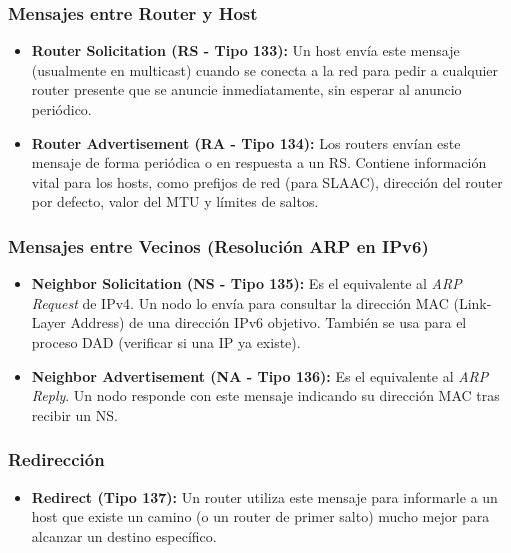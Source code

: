 \subsubsection{Mensajes entre Router y Host}
\begin{itemize}[label=\textcolor{acento!60}{$\bullet$}]
    \item \textbf{Router Solicitation (RS - Tipo 133):} Un host envía este mensaje (usualmente en multicast) cuando se conecta a la red para pedir a cualquier router presente que se anuncie inmediatamente, sin esperar al anuncio periódico.
    \item \textbf{Router Advertisement (RA - Tipo 134):} Los routers envían este mensaje de forma periódica o en respuesta a un RS. Contiene información vital para los hosts, como prefijos de red (para SLAAC), dirección del router por defecto, valor del MTU y límites de saltos.
\end{itemize}

\subsubsection{Mensajes entre Vecinos (Resolución ARP en IPv6)}
\begin{itemize}[label=\textcolor{acento!120}{$\bullet$}]
    \item \textbf{Neighbor Solicitation (NS - Tipo 135):} Es el equivalente al \textit{ARP Request} de IPv4. Un nodo lo envía para consultar la dirección MAC (Link-Layer Address) de una dirección IPv6 objetivo. También se usa para el proceso DAD (verificar si una IP ya existe).
    \item \textbf{Neighbor Advertisement (NA - Tipo 136):} Es el equivalente al \textit{ARP Reply}. Un nodo responde con este mensaje indicando su dirección MAC tras recibir un NS.
\end{itemize}

\subsubsection{Redirección}
\begin{itemize}[label=\textcolor{acento!90}{$\bullet$}]
    \item \textbf{Redirect (Tipo 137):} Un router utiliza este mensaje para informarle a un host que existe un camino (o un router de primer salto) mucho mejor para alcanzar un destino específico.
\end{itemize}